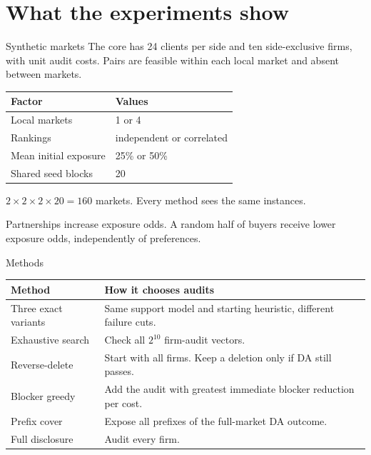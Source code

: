 \section{What the experiments show}
\begin{frame}[t,label=design]{Synthetic markets}
\small
\setlength{\parskip}{1pt}
The core has 24 clients per side and ten side-exclusive firms, with unit audit
costs. Pairs are feasible within each local market and absent between markets.
\begin{center}
\begin{tabular}{@{}ll@{}}
\toprule
Factor & Values\\
\midrule
Local markets & 1 or 4\\
Rankings & independent or correlated\\
Mean initial exposure & 25\% or 50\%\\
Shared seed blocks & 20\\
\bottomrule
\end{tabular}
\end{center}
$2\times2\times2\times20=160$ markets. Every method sees the same instances.

Partnerships increase exposure odds. A random half of buyers receive
lower exposure odds, independently of preferences.
\end{frame}

\begin{frame}[t,label=baselines]{Methods}
\small
\begin{tabularx}{\linewidth}{@{}lX@{}}
\toprule
Method & How it chooses audits\\
\midrule
Three exact variants & Same support model and starting heuristic, different failure cuts.\\[4pt]
Exhaustive search & Check all $2^{10}$ firm-audit vectors.\\[4pt]
Reverse-delete & Start with all firms. Keep a deletion only if DA still passes.\\[4pt]
Blocker greedy & Add the audit with greatest immediate blocker reduction per cost.\\[4pt]
Prefix cover & Expose all prefixes of the full-market DA outcome.\\[4pt]
Full disclosure & Audit every firm.\\
\bottomrule
\end{tabularx}
\end{frame}

